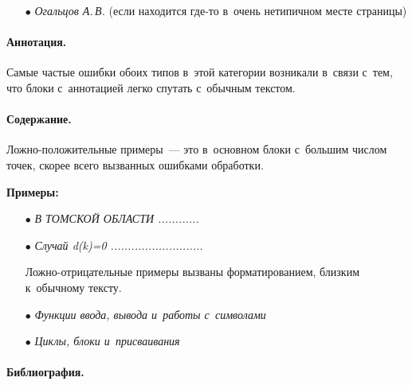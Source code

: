 \begin{multicols}{2}

\begin{itemize}
\item[$\bullet$]
\textit{Огальцов А.\,В.} (если находится где-то в~очень нетипичном месте 
страницы)
\end{itemize}

\vspace*{-10pt}

\paragraph*{Аннотация.}

Самые частые ошибки обоих типов в~этой категории возникали в~связи с~тем, что 
блоки с~аннотацией легко спутать с~обычным текс\-том.

\vspace*{-10pt}

\paragraph*{Содержание.}

Ложно-положительные примеры~--- это в~основном блоки с~большим чис\-лом точек, 
скорее всего вызванных ошибками обработки.

\textbf{Примеры:}

\begin{itemize}

\item[$\bullet$]
\textit{В ТОМСКОЙ ОБЛАСТИ ............}

\item[$\bullet$]
\textit{Случай d(k)=0 ...........................}

Ложно-отрицательные примеры вызваны форматированием, близким к~обычному тексту.

\item[$\bullet$]
\textit{Функции ввода, вывода и~работы с~символами}

\item[$\bullet$]
\textit{Циклы, блоки и~присваивания}
\end{itemize}

\vspace*{-10pt}

\paragraph*{Библиография.}


\end{multicols}
